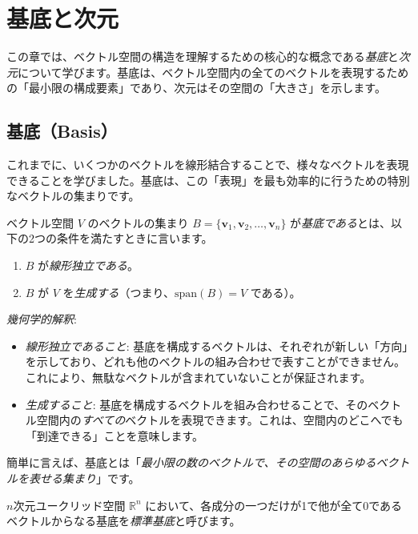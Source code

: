 \section{基底と次元} \setcounter{ex}{0}

この章では、ベクトル空間の構造を理解するための核心的な概念である\emph{基底}と\emph{次元}について学びます。基底は、ベクトル空間内の全てのベクトルを表現するための「最小限の構成要素」であり、次元はその空間の「大きさ」を示します。

\subsection{基底（Basis）}

これまでに、いくつかのベクトルを線形結合することで、様々なベクトルを表現できることを学びました。基底は、この「表現」を最も効率的に行うための特別なベクトルの集まりです。

\begin{dfn}[基底] \label{basis}
ベクトル空間 $V$ のベクトルの集まり $B = \{\bm{v}_1, \bm{v}_2, \ldots, \bm{v}_n\}$ が\emph{基底である}とは、以下の2つの条件を満たすときに言います。
\begin{enumerate}
\item $B$ が\emph{線形独立である}。
\item $B$ が $V$ を\emph{生成する}（つまり、$\text{span}(B) = V$ である）。
\end{enumerate}
\end{dfn}

\emph{幾何学的解釈}:
\begin{itemize}
\item \emph{線形独立であること}: 基底を構成するベクトルは、それぞれが新しい「方向」を示しており、どれも他のベクトルの組み合わせで表すことができません。これにより、無駄なベクトルが含まれていないことが保証されます。
\item \emph{生成すること}: 基底を構成するベクトルを組み合わせることで、そのベクトル空間内の\emph{すべての}ベクトルを表現できます。これは、空間内のどこへでも「到達できる」ことを意味します。
\end{itemize}

簡単に言えば、基底とは「\emph{最小限の数のベクトルで、その空間のあらゆるベクトルを表せる集まり}」です。

\begin{dfn}[標準基底] \label{standard_basis}
$n$次元ユークリッド空間 $\mathbb{R}^n$ において、各成分の一つだけが1で他が全て0であるベクトルからなる基底を\emph{標準基底}と呼びます。
\end{dfn}

